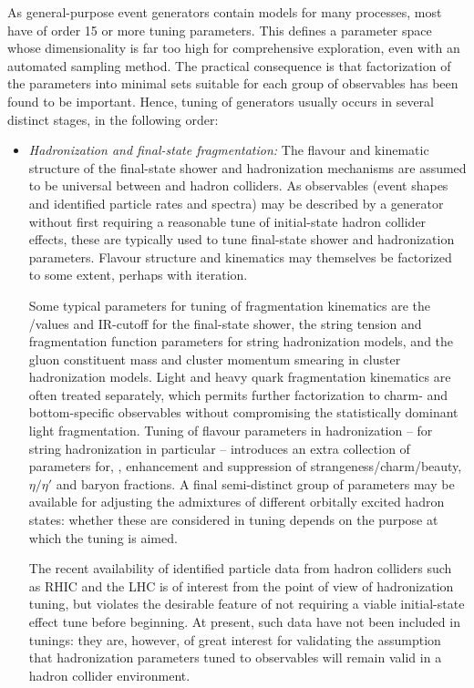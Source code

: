 As general-purpose event generators contain models for many processes, most have
of order 15 or more tuning parameters. This defines a parameter space whose
dimensionality is far too high for comprehensive exploration, even with an
automated sampling method. The practical consequence is that factorization of
the parameters into minimal sets suitable for each group of observables has been
found to be important. Hence, tuning of generators usually occurs in several
distinct stages, in the following order:
%
\begin{itemize}
\item {\em Hadronization and final-state fragmentation:} The flavour and kinema\-tic
  structure of the final-state shower and hadronization mechanisms are assumed
  to be universal between \ee and hadron colliders. As \ee
  observables (\eg event shapes and identified particle rates and \pt spectra)
  may be described by a generator without first requiring a reasonable tune of
  initial-state hadron collider effects, these are typically used to tune final-state
  shower and hadronization parameters. Flavour structure and kinematics
  may themselves be factorized to some extent, perhaps with iteration.

  Some typical parameters for tuning of fragmentation kinematics are the
  \alphaS/\LambdaQCD values and IR-cutoff for the final-state shower, the string
  tension and fragmentation function parameters for string hadronization models,
  and the gluon constituent mass and cluster momentum smearing in cluster
  hadronization models. Light and heavy quark fragmentation kinematics are often
  treated separately, which permits further factorization to charm- and
  bottom-specific observables without compromising the statistically dominant
  light fragmentation. Tuning of flavour parameters in hadronization -- for
  string hadronization in particular -- introduces an extra collection of
  parameters for, \eg, enhancement and suppression of strangeness/charm/beauty,
  $\eta/\eta'$ and baryon fractions. A final semi-distinct group of parameters
  may be available for adjusting the admixtures of different orbitally excited
  hadron states: whether these are considered in tuning depends on the purpose
  at which the tuning is aimed.

  The recent availability of identified particle data from hadron colliders such
  as RHIC and the LHC is of interest from the point of view of hadronization
  tuning, but violates the desirable feature of not requiring a viable
  initial-state effect tune before beginning. At present, such data have not
  been included in tunings: they are, however, of great interest for validating
  the assumption that hadronization parameters tuned to \ee observables will
  remain valid in a hadron collider environment.


\end{itemize}
